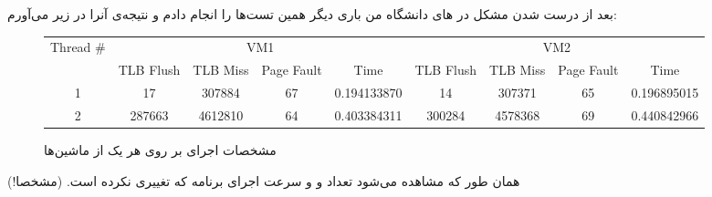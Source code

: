 بعد از درست شدن مشکل
در
های
دانشگاه من باری دیگر همین تست‌ها را انجام دادم و نتیجه‌ی آنرا در زیر می‌آورم:
\begin{figure}[H]
    \small
    \centering
    \begin{latin}
    \begin{tabular}{|c|cccc|cccc|}
        \hline
        \multirow{2}{*}{Thread \#} & \multicolumn{4}{|c|}{VM1} & \multicolumn{4}{|c|}{VM2}\\
        & TLB Flush & TLB Miss & Page Fault & Time & TLB Flush & TLB Miss & Page Fault & Time\\
        \hline
        1 & 17&307884&67&0.194133870& 14&307371&65&0.196895015\\
        2 & 287663&4612810&64&0.403384311 & 300284&4578368&69&0.440842966\\
        \hline
    \end{tabular}
    \end{latin}
    \caption{مشخصات اجرای بر روی هر یک از ماشین‌ها}
\end{figure}
همان طور که مشاهده می‌شود تعداد
 و 
و سرعت اجرای برنامه که تغییری نکرده است. (مشخصا!)
